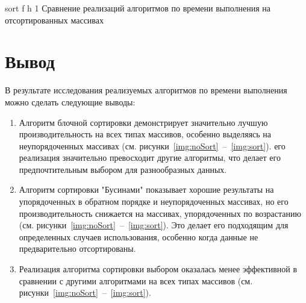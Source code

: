 {sort} %
{f} %
{h} %
{1\textwidth} %
{Сравнение реализаций алгоритмов по времени выполнения на отсортированных массивах} %
\clearpage

\section{Вывод}

В результате исследования реализуемых алгоритмов по времени выполнения можно сделать следующие выводы:
\begin{enumerate}
	\item Алгоритм блочной сортировки демонстрирует значительно лучшую производительность на всех типах массивов, особенно выделяясь на неупорядоченных массивах (см. рисунки~\ref{img:noSort}~--~\ref{img:sort}). его реализация значительно превосходит другие алгоритмы, что делает его предпочтительным выбором для разнообразных данных.
	\item Алгоритм сортировки "Бусинами" показывает хорошие результаты на упорядоченных в обратном порядке и неупорядоченных массивах, но его  производительность снижается на массивах, упорядоченных по возрастанию (см. рисунки~\ref{img:noSort}~--~\ref{img:sort}). Это делает его подходящим для определенных случаев использования, особенно когда данные не предварительно отсортированы.
	\item Реализация алгоритма сортировки выбором  оказалась менее эффективной в сравнении с другими алгоритмами на всех типах массивов (см. рисунки~\ref{img:noSort}~--~\ref{img:sort}).
\end{enumerate}


